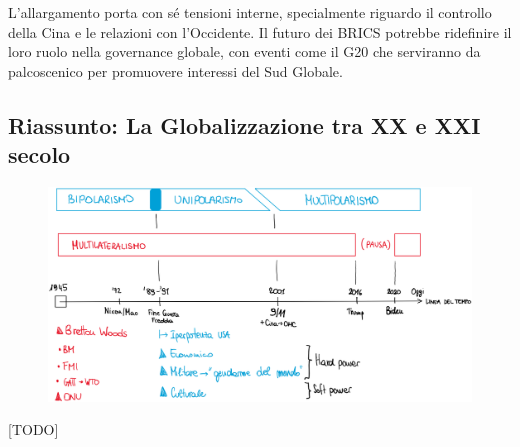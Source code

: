 \documentclass{article}
\begin{document}
L'allargamento porta con sé tensioni interne, specialmente riguardo il controllo della Cina e
le relazioni con l'Occidente. Il futuro dei BRICS potrebbe ridefinire il loro ruolo nella
governance globale, con eventi come il G20 che serviranno da palcoscenico per promuovere
interessi del Sud Globale.

\subsection{Riassunto: La Globalizzazione tra XX e XXI secolo}
\begin{figure}[h!]
    \centering
    \includegraphics[width=1\textwidth]{media/brics.png}
\end{figure}
[TODO]
\end{document}
